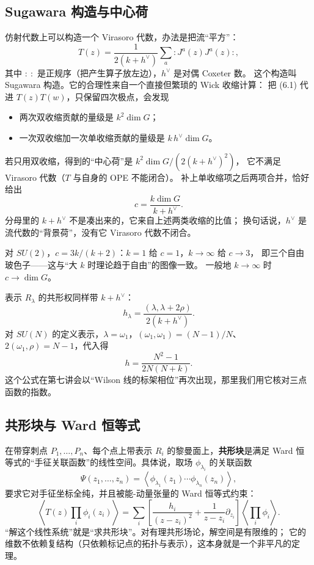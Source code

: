 \subsection{Sugawara 构造与中心荷}

仿射代数上可以构造一个 Virasoro 代数，办法是把流“平方”：
\begin{equation}
T(z)=\frac{1}{2(k+h^\vee)}\sum_a :J^a(z)J^a(z):, \tag{6.2}
\end{equation}
其中 $:\ :$ 是正规序（把产生算子放左边），$h^\vee$ 是对偶 Coxeter 数。
这个构造叫 Sugawara 构造。它的合理性来自一个直接但繁琐的 Wick 收缩计算：
把 (6.1) 代进 $T(z)T(w)$，只保留四次极点，会发现
\begin{itemize}[leftmargin=*]
  \item 两次双收缩贡献的量级是 $k^2\dim G$；
  \item 一次双收缩加一次单收缩贡献的量级是 $k\,h^\vee\dim G$。
\end{itemize}
若只用双收缩，得到的“中心荷”是 $k^2\dim G/(2(k+h^\vee)^2)$，
它不满足 Virasoro 代数（$T$ 与自身的 OPE 不能闭合）。
补上单收缩项之后两项合并，恰好给出
\begin{equation}
c=\frac{k\dim G}{k+h^\vee}. \tag{6.3}
\end{equation}
分母里的 $k+h^\vee$ 不是凑出来的，它来自上述两类收缩的比值；
换句话说，$h^\vee$ 是流代数的“背景荷”，没有它 Virasoro 代数不闭合。

对 $SU(2)$，$c=3k/(k+2)$：$k=1$ 给 $c=1$，$k\to\infty$ 给 $c\to3$，
即三个自由玻色子——这与“大 $k$ 时理论趋于自由”的图像一致。
一般地 $k\to\infty$ 时 $c\to\dim G$。

表示 $R_\lambda$ 的共形权同样带 $k+h^\vee$：
\begin{equation}
h_\lambda=\frac{(\lambda,\lambda+2\rho)}{2(k+h^\vee)}. \tag{6.4}
\end{equation}
对 $SU(N)$ 的定义表示，$\lambda=\omega_1$，$(\omega_1,\omega_1)=(N-1)/N$、
$2(\omega_1,\rho)=N-1$，代入得
\[
h=\frac{N^2-1}{2N(N+k)} .
\]
这个公式在第七讲会以“Wilson 线的标架相位”再次出现，那里我们用它核对三点函数的指数。

\subsection{共形块与 Ward 恒等式}

在带穿刺点 $P_1,\dots,P_n$、每个点上带表示 $R_i$ 的黎曼面上，\textbf{共形块}是满足
Ward 恒等式的“手征关联函数”的线性空间。具体说，取场 $\phi_{\lambda_i}$ 的关联函数
\[
\Psi(z_1,\dots,z_n)=\left\langle\phi_{\lambda_1}(z_1)\cdots\phi_{\lambda_n}(z_n)\right\rangle ,
\]
要求它对手征坐标全纯，并且被能-动量张量的 Ward 恒等式约束：
\[
\left\langle T(z)\prod_i\phi_i(z_i)\right\rangle
=\sum_i\left[\frac{h_i}{(z-z_i)^2}+\frac{1}{z-z_i}\partial_{z_i}\right]
\left\langle\prod_i\phi_i\right\rangle .
\]
“解这个线性系统”就是“求共形块”。对有理共形场论，解空间是有限维的；
它的维数不依赖复结构（只依赖标记点的拓扑与表示），这本身就是一个非平凡的定理。

